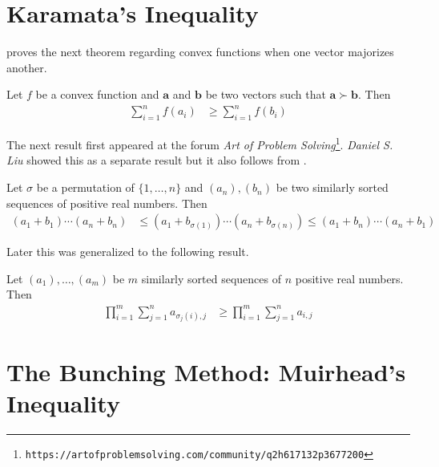 \documentclass[inequalities.tex]{subfile}
\begin{document}
	\section[Karamata]{Karamata's Inequality}\label{sec:karamata}
	\textcite{karamata_1932} proves the next theorem regarding convex functions when one vector majorizes another.
		\begin{theorem}\label{thm:karamata}
			Let $f$ be a convex function and $\mathbf{a}$ and $\mathbf{b}$ be two vectors such that $\mathbf{a}\succ\mathbf{b}$. Then
				\begin{align*}
					\sum\limits_{i=1}^{n}f(a_{i})
						& \geq \sum\limits_{i=1}^{n}f(b_{i})
				\end{align*}
		\end{theorem}
	The next result first appeared at the forum \textit{Art of Problem Solving}\footnote{\texttt{https://artofproblemsolving.com/community/q2h617132p3677200}}. \textit{Daniel S. Liu} showed this as a separate result but it also follows from .
		\begin{theorem}\label{thm:reverse}
			Let $\sigma$ be a permutation of $\{1,\ldots,n\}$ and $(a_{n}),(b_{n})$ be two similarly sorted sequences of positive real numbers. Then
				\begin{align*}
					(a_{1}+b_{1})\cdots(a_{n}+b_{n})
						& \leq (a_{1}+b_{\sigma(1)})\cdots(a_{n}+b_{\sigma(n)})\leq(a_{1}+b_{n})\cdots(a_{n}+b_{1})
				\end{align*}
		\end{theorem}
	Later this was generalized to the following result.
		\begin{theorem}\label{thm:genreverse}
			Let $(a_{1}),\ldots,(a_{m})$ be $m$ similarly sorted sequences of $n$ positive real numbers. Then
				\begin{align*}
					\prod_{i=1}^{m}\sum\limits_{j=1}^{n}a_{\sigma_{j}(i),j}
						& \geq \prod_{i=1}^{m}\sum\limits_{j=1}^{n}a_{i,j}
				\end{align*}
		\end{theorem}
	\section[Bunching: Muirhead]{The Bunching Method: Muirhead's Inequality}\label{sec:bunching}
\end{document}
